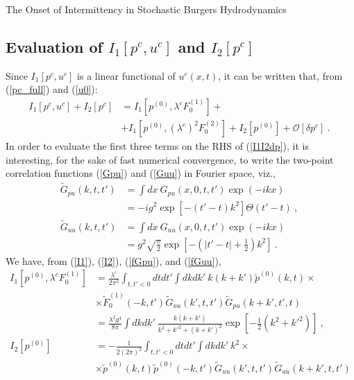 \begin{chapter}{The Onset of Intermittency in Stochastic Burgers Hydrodynamics}
\subsection{Evaluation of $I_1 [p^c,u^c]$ and $I_2 [p^c]$}

Since $I_1 [p^c,u^c]$ is a linear functional of $u^c(x,t)$, it can be written that, from (\ref{pc_full}) and (\ref{u0}):
\begin{equation} \begin{split} \label{I1I2dp}
I_1 [p^c,u^c] + I_2 [p^c] &= I_1 [p^{(0)},\lambda^c F_0^{(1)}] + \\
&+ I_1 [p^{(0)}, (\lambda^c)^2 F_0^{(2)}] + I_2 [p^{(0)}] + \mathcal{O}[\delta p^c] \ . \
\end{split} \end{equation}
In order to evaluate the first three terms on the RHS of (\ref{I1I2dp}), it is interesting, for the sake of fast numerical convergence,
to write the two-point correlation functions (\ref{Gpu}) and (\ref{Guu}) in Fourier space, viz.,
\begin{subequations}
\begin{align}
\tilde G_{pu} (k,t,t') &= \int d x \ G_{pu}(x,0,t,t') \exp(-ikx) \nonumber \\ &= -i g^2 \exp \left [ - (t' -t)k^2 \right ] \Theta(t'-t) \ , \ \label{fGpu} \\
\tilde G_{uu} (k,t,t') &= \int d x \ G_{uu}(x,0,t,t') \exp(-ikx) \nonumber \\ &= g^2 \sqrt{\frac{\pi}{2}} \exp \left
[ - \left (|t' -t| + \frac{1}{2} \right ) k^2 \right ] \ . \ \label{fGuu}
\end{align}
\end{subequations}
We have, from (\ref{I1}), (\ref{I2}), (\ref{fGpu}), and (\ref{fGuu}),
\begin{subequations}
\begin{align}
I_1[p^{(0)},\lambda^c F_0^{(1)}]  &= \frac{\lambda^c }{2 \pi^2} \int_{t,t'<0} dt dt' \int dk dk' ~  k(k+k') \tilde p^{(0)}(k,t) \times \nonumber \\ &\times \tilde F_0^{(1)} (-k,t') \tilde G_{uu} (k',t,t')   \tilde G_{pu}(k + k',t',t) \nonumber \\
&= \frac{\lambda^2 g^4}{8 \pi} \int dk dk' ~  \frac{k(k+k')}{k^2+k'^2+(k+k')^2}  \exp \left [ -\frac{1}{2} \left (k^2+k'^2 \right ) \right ]  \ , \ \label{I1n}
\\
I_2[p^{(0)}] &= - \frac{1}{2(2 \pi)^2} \int_{t,t'<0} dt dt' \int dk dk' \ k^2 \nonumber \times \\ &\times \tilde p^{(0)}(k,t) \tilde p^{(0)}(-k,t') \tilde G_{uu} (k',t,t')  \tilde G_{uu}(k + k',t,t') \nonumber \\

\end{align}
\end{subequations}
\end{chapter}
